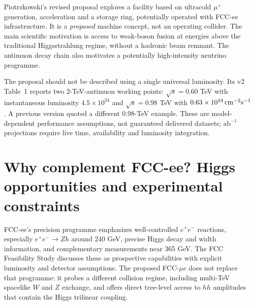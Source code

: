 \documentclass[12pt,a4paper]{article}
\newcommand{\newnote}{\clearpage}
\newcommand{\smallsource}[1]{\par\vspace{-2pt}{\footnotesize\color{gray}\raggedright\emph{Source/status: #1}\par}}
\begin{document}
Piotrzkowski's revised proposal \cite{piotr} explores a facility based on ultracold $\mu^+$ generation, acceleration and a storage ring, potentially operated with FCC-ee infrastructure. It is a \emph{proposed} machine concept, not an operating collider. The main scientific motivation is access to weak-boson fusion at energies above the traditional Higgsstrahlung regime, without a hadronic beam remnant. The antimuon decay chain also motivates a potentially high-intensity neutrino programme.

The proposal should not be described using a single universal luminosity. Its v2 Table~1 reports two 2-TeV-antimuon working points: $\sqrt{s}=0.60$ TeV with instantaneous luminosity $4.5\times10^{34}$ and $\sqrt{s}=0.98$ TeV with $0.63\times10^{34}\,{\rm cm}^{-2}{\rm s}^{-1}$. A previous version quoted a different 0.98-TeV example. These are model-dependent performance assumptions, not guaranteed delivered datasets; $\mathrm{ab}^{-1}$ projections require live time, availability and luminosity integration.





\newnote

\section{Why complement FCC-ee? Higgs opportunities and experimental constraints}

FCC-ee's precision programme emphasizes well-controlled $e^+e^-$ reactions, especially $e^+e^-\to Zh$ around 240 GeV, precise Higgs decay and width information, and complementary measurements near 365 GeV. The FCC Feasibility Study \cite{fcc} discusses these as prospective capabilities with explicit luminosity and detector assumptions. The proposed FCC-$\mu e$ does not replace that programme: it probes a different collision regime, including multi-TeV spacelike $W$ and $Z$ exchange, and offers direct tree-level access to $hh$ amplitudes that contain the Higgs trilinear coupling.

\end{document}

